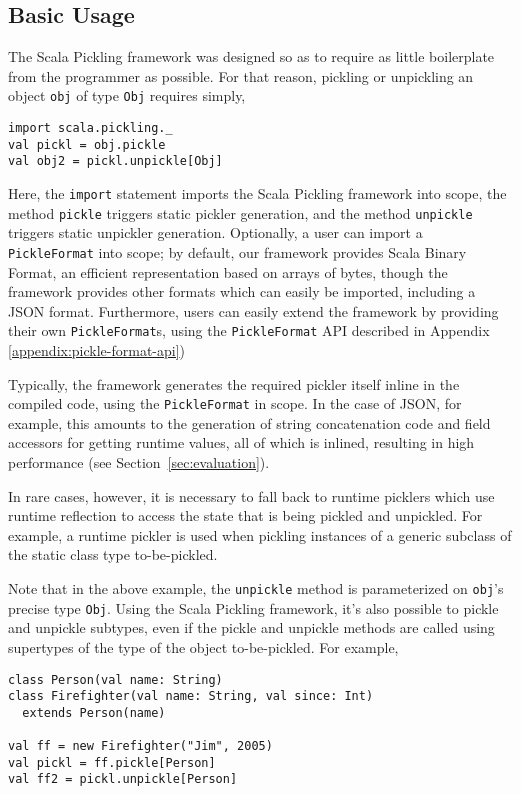\documentclass[preprint,10pt]{sigplanconf}
\theoremstyle{definition}
\newcommand{\term}[1]{\mbox{\texttt{#1}}}
\begin{document}
\subsection{Basic Usage}

The Scala Pickling framework was designed so as to require as little
boilerplate from the programmer as possible. For that reason, pickling or
unpickling an object \term{obj} of type \term{Obj} requires simply,

\begin{lstlisting}
import scala.pickling._
val pickl = obj.pickle
val obj2 = pickl.unpickle[Obj]
\end{lstlisting}

Here, the \term{import} statement imports the Scala Pickling framework into scope,
the method \term{pickle} triggers static pickler generation, and the method
\term{unpickle} triggers static unpickler generation. Optionally, a user can
import a \term{PickleFormat} into scope; by default, our framework provides
Scala Binary Format, an efficient representation based on arrays of bytes,
though the framework provides other formats which can easily be imported,
including a JSON format. Furthermore, users can easily extend the framework by
providing their own \term{PickleFormat}s, using the \term{PickleFormat} API
described in Appendix \ref{appendix:pickle-format-api})

Typically, the framework generates the required pickler itself inline in the
compiled code, using the \term{PickleFormat} in scope. In the case of JSON,
for example, this amounts to the generation of string concatenation code and
field accessors for getting runtime values, all of which is inlined, resulting
in high performance (see Section~\ref{sec:evaluation}).

In rare cases, however, it is necessary to fall back to runtime picklers which
use runtime reflection to access the state that is being pickled and
unpickled. For example, a runtime pickler is used when pickling instances of a
generic subclass of the static class type to-be-pickled.

Note that in the above example, the \term{unpickle} method is parameterized on
\term{obj}'s precise type \term{Obj}. Using the Scala Pickling framework, it's
also possible to pickle and unpickle subtypes, even if the pickle and unpickle
methods are called using supertypes of the type of the object to-be-pickled.
For example,

\begin{lstlisting}
class Person(val name: String)
class Firefighter(val name: String, val since: Int)
  extends Person(name)

val ff = new Firefighter("Jim", 2005)
val pickl = ff.pickle[Person]
val ff2 = pickl.unpickle[Person]
\end{lstlisting}
\end{document}
